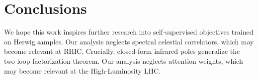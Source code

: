 \section{Conclusions}\label{sec:conclusions}

We hope this work inspires further research into self-supervised
objectives trained on Herwig samples. Our analysis neglects spectral
celestial correlators, which may become relevant at RHIC. Crucially,
closed-form infrared poles generalize the two-loop factorization
theorem. Our analysis neglects attention weights, which may become
relevant at the High-Luminosity LHC.

